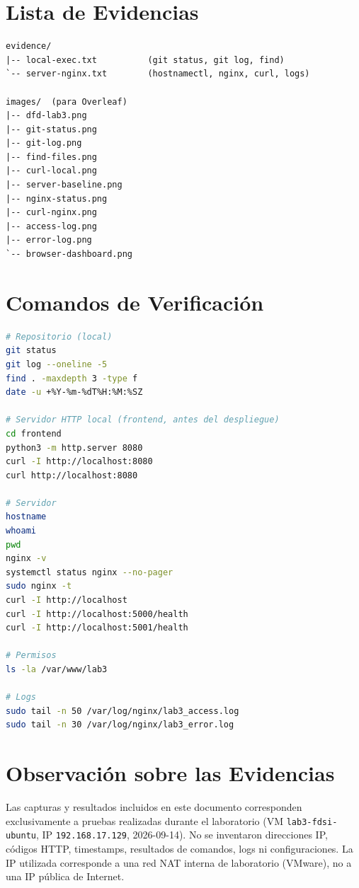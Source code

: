 \documentclass[journal]{IEEEtran}
\begin{document}
\section{Lista de Evidencias}

\begin{lstlisting}
evidence/
|-- local-exec.txt          (git status, git log, find)
`-- server-nginx.txt        (hostnamectl, nginx, curl, logs)

images/  (para Overleaf)
|-- dfd-lab3.png
|-- git-status.png
|-- git-log.png
|-- find-files.png
|-- curl-local.png
|-- server-baseline.png
|-- nginx-status.png
|-- curl-nginx.png
|-- access-log.png
|-- error-log.png
`-- browser-dashboard.png
\end{lstlisting}

\section{Comandos de Verificación}
\label{app:comandos}

\begin{lstlisting}[language=bash]
# Repositorio (local)
git status
git log --oneline -5
find . -maxdepth 3 -type f
date -u +%Y-%m-%dT%H:%M:%SZ

# Servidor HTTP local (frontend, antes del despliegue)
cd frontend
python3 -m http.server 8080
curl -I http://localhost:8080
curl http://localhost:8080

# Servidor
hostname
whoami
pwd
nginx -v
systemctl status nginx --no-pager
sudo nginx -t
curl -I http://localhost
curl -I http://localhost:5000/health
curl -I http://localhost:5001/health

# Permisos
ls -la /var/www/lab3

# Logs
sudo tail -n 50 /var/log/nginx/lab3_access.log
sudo tail -n 30 /var/log/nginx/lab3_error.log
\end{lstlisting}

\section{Observación sobre las Evidencias}

Las capturas y resultados incluidos en este documento corresponden
exclusivamente a pruebas realizadas durante el laboratorio (VM
\texttt{lab3-fdsi-ubuntu}, IP \texttt{192.168.17.129}, 2026-09-14). No se
inventaron direcciones IP, códigos HTTP, timestamps, resultados de comandos,
logs ni configuraciones. La IP utilizada corresponde a una red NAT interna de
laboratorio (VMware), no a una IP pública de Internet.
\end{document}
